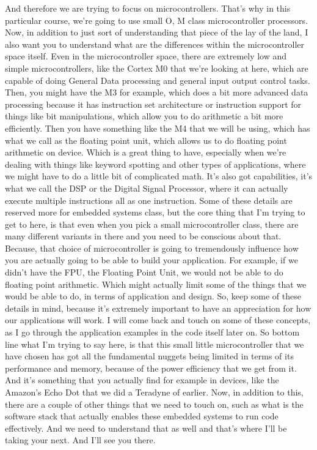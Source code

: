 And therefore we are trying to focus on microcontrollers.
That's why in this particular course, we're going to use small O, M class microcontroller processors.
Now, in addition to just sort of understanding that piece of the lay of the land, I also want you to understand what are the differences within the microcontroller space itself.
Even in the microcontroller space, there are extremely low and simple microcontrollers, like the Cortex M0 that we're looking at here, which are capable of doing General Data processing and general input output control tasks.
Then, you might have the M3 for example, which does a bit more advanced data processing because it has instruction set architecture or instruction support for things like bit manipulations, which allow you to do arithmetic a bit more efficiently.
Then you have something like the M4 that we will be using, which has what we call as the floating point unit, which allows us to do floating point arithmetic on device.
Which is a great thing to have, especially when we're dealing with things like keyword spotting and other types of applications, where we might have to do a little bit of complicated math.
It's also got capabilities, it's what we call the DSP or the Digital Signal Processor, where it can actually execute multiple instructions all as one instruction.
Some of these details are reserved more for embedded systems class, but the core thing that I'm trying to get to here, is that even when you pick a small microcontroller class, there are many different variants in there and you need to be conscious about that.
Because, that choice of microcontroller is going to tremendously influence how you are actually going to be able to build your application.
For example, if we didn't have the FPU, the Floating Point Unit, we would not be able to do floating point arithmetic.
Which might actually limit some of the things that we would be able to do, in terms of application and design.
So, keep some of these details in mind, because it's extremely important to have an appreciation for how
our applications will work.
I will come back and touch on some of these concepts, as I go through the application examples in the code itself later on.
So bottom line what I'm trying to say here, is that this small little microcontroller that we have chosen has got all the fundamental nuggets being limited in terms of its performance and memory, because of the power efficiency that we get from it.
And it's something that you actually find for example in devices, like the Amazon's Echo Dot that we did a Teradyne of earlier.
Now, in addition to this, there are a couple of other things that we need to touch on, such as what is the software stack that actually enables these embedded systems to run code effectively.
And we need to understand that as well and that's where I'll be taking your next.
And I'll see you there.


